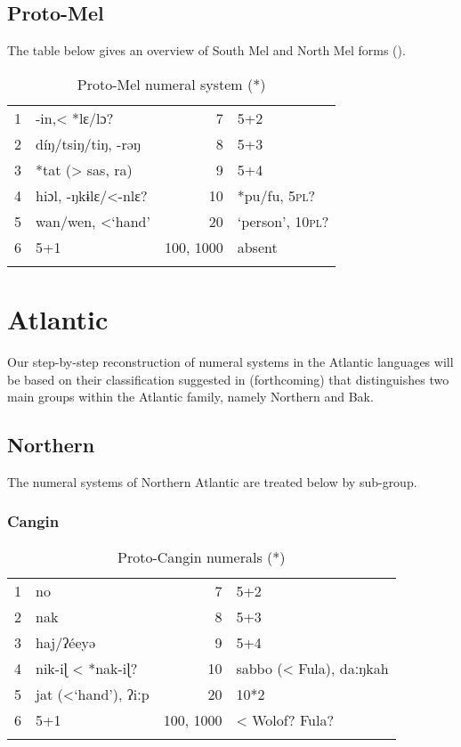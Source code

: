 \subsection{Proto-Mel}%
The table below gives an overview of South Mel and North Mel forms ().

\begin{table}
\caption{\label{tab:3:219}Proto-Mel numeral system (*)}


\begin{tabularx}{\textwidth}{lQrl}
\lsptoprule

1 & -in,< *lɛ/lɔ? & 7 & 5+2\\
2 & díŋ/tsiŋ/tiŋ, -rəŋ & 8 & 5+3\\
3 & *tat (> sas, ra) & 9 & 5+4\\
4 & hiɔl, -ŋkɨlɛ/<-nlɛ? & 10 & *pu/fu, 5\textsc{pl}? \\
5 & wan/wen, <‘hand’ & 20 & ‘person’, 10\textsc{pl}? \\
6 & 5+1 &  {100,} 1000 & absent\\
\lspbottomrule
\end{tabularx}

\end{table}
\section{Atlantic}%

Our step-by-step reconstruction of numeral systems in the Atlantic languages will be based on their classification suggested in \citealt{PozdniakovSegerer2017} (forthcoming) that distinguishes two main groups within the Atlantic family, namely Northern and Bak.


\subsection{Northern}%
The numeral systems of Northern Atlantic are treated below by sub-group.

\subsubsection{Cangin} %
\begin{table}
\caption{\label{tab:3:220}Proto-Cangin numerals (*)}


\begin{tabularx}{\textwidth}{lQrl}
\lsptoprule

1 & no & 7 & 5+2\\
2 & nak & 8 & 5+3\\
3 & haj/ʔéeyə & 9 & 5+4\\
4 & nik-iɭ < *nak-iɭ? & 10 & sabbo (< Fula), daːŋkah\\
5 & jat (<`hand'), ʔiːp & 20 & 10*2\\
6 & 5+1 & 100, 1000 & < Wolof? Fula?\\
\lspbottomrule
\end{tabularx}
\end{table}

